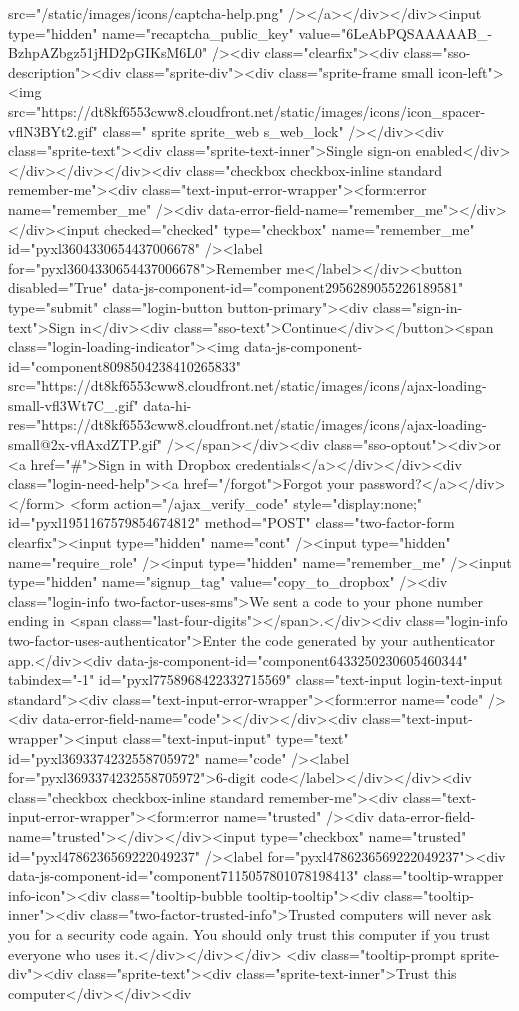 {src="/static/images/icons/captcha-help.png" /></a></div></div><input type="hidden" name="recaptcha_public_key" value="6LeAbPQSAAAAAB_-BzhpAZbgz51jHD2pGIKsM6L0" /><div class="clearfix"><div class="sso-description"><div class="sprite-div"><div class="sprite-frame small icon-left"><img src="https://dt8kf6553cww8.cloudfront.net/static/images/icons/icon_spacer-vflN3BYt2.gif" class=" sprite sprite_web s_web_lock" /></div><div class="sprite-text"><div class="sprite-text-inner">Single sign-on enabled</div></div></div></div><div class="checkbox checkbox-inline standard remember-me"><div class="text-input-error-wrapper"><form:error name="remember_me" /><div data-error-field-name="remember_me"></div></div><input checked="checked" type="checkbox" name="remember_me" id="pyxl3604330654437006678" /><label for="pyxl3604330654437006678">Remember me</label></div><button disabled="True" data-js-component-id="component2956289055226189581" type="submit" class="login-button button-primary"><div class="sign-in-text">Sign in</div><div class="sso-text">Continue</div></button><span class="login-loading-indicator"><img data-js-component-id="component8098504238410265833" src="https://dt8kf6553cww8.cloudfront.net/static/images/icons/ajax-loading-small-vfl3Wt7C_.gif" data-hi-res="https://dt8kf6553cww8.cloudfront.net/static/images/icons/ajax-loading-small@2x-vflAxdZTP.gif" /></span></div><div class="sso-optout"><div>or <a href="#">Sign in with Dropbox credentials</a></div></div><div class="login-need-help"><a href="/forgot">Forgot your password?</a></div></form> <form action="/ajax_verify_code" style="display:none;" id="pyxl1951167579854674812" method="POST" class="two-factor-form clearfix"><input type="hidden" name="cont" /><input type="hidden" name="require_role" /><input type="hidden" name="remember_me" /><input type="hidden" name="signup_tag" value="copy_to_dropbox" /><div class="login-info two-factor-uses-sms">We sent a code to your phone number ending in <span class="last-four-digits"></span>.</div><div class="login-info two-factor-uses-authenticator">Enter the code generated by your authenticator app.</div><div data-js-component-id="component6433250230605460344" tabindex="-1" id="pyxl7758968422332715569" class="text-input login-text-input standard"><div class="text-input-error-wrapper"><form:error name="code" /><div data-error-field-name="code"></div></div><div class="text-input-wrapper"><input class="text-input-input" type="text" id="pyxl3693374232558705972" name="code" /><label for="pyxl3693374232558705972">6-digit code</label></div></div><div class="checkbox checkbox-inline standard remember-me"><div class="text-input-error-wrapper"><form:error name="trusted" /><div data-error-field-name="trusted"></div></div><input type="checkbox" name="trusted" id="pyxl4786236569222049237" /><label for="pyxl4786236569222049237"><div data-js-component-id="component7115057801078198413" class="tooltip-wrapper info-icon"><div class="tooltip-bubble tooltip-tooltip"><div class="tooltip-inner"><div class="two-factor-trusted-info">Trusted computers will never ask you for a security code again. You should only trust this computer if you trust everyone who uses it.</div></div></div> <div class="tooltip-prompt sprite-div"><div class="sprite-text"><div class="sprite-text-inner">Trust this computer</div></div><div }
